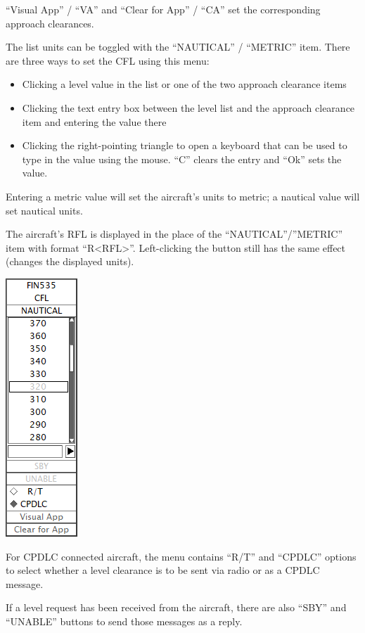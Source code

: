 \documentclass[11pt,a4paper,oldfontcommands]{memoir}
\begin{document}
“Visual App” / “VA” and “Clear for App” / “CA” set the corresponding approach clearances.

The list units can be toggled with the “NAUTICAL” / “METRIC” item. There are three ways to set the CFL using this menu:

\begin{itemize}
        \item Clicking a level value in the list or one of the two approach clearance items
        \item Clicking the text entry box between the level list and the approach clearance item and entering the value there
        \item Clicking the right-pointing triangle to open a keyboard that can be used to type in the value using the mouse. “C” clears the entry and “Ok” sets the value.
\end{itemize}

Entering a metric value will set the aircraft’s units to metric; a nautical value will set nautical units.

The aircraft’s RFL is displayed in the place of the “NAUTICAL”/”METRIC” item with format “R<RFL>”. Left-clicking the button still has the same effect (changes the displayed units).

\includegraphics{img/cfldl.png}

For CPDLC connected aircraft, the menu contains “R/T” and “CPDLC” options to select whether a level clearance is to be sent via radio or as a CPDLC message.

If a level request has been received from the aircraft, there are also “SBY” and “UNABLE” buttons to send those messages as a reply.
\end{document}
